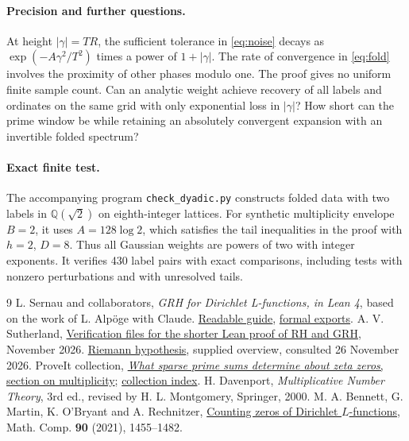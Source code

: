 \documentclass[11pt]{article}
\begin{document}
\paragraph{Precision and further questions.}
At height $|\gamma|=TR$, the sufficient tolerance in \eqref{eq:noise} decays as $\exp(-A\gamma^2/T^2)$ times a power of $1+|\gamma|$. The rate of convergence in \eqref{eq:fold} involves the proximity of other phases modulo one. The proof gives no uniform finite sample count. Can an analytic weight achieve recovery of all labels and ordinates on the same grid with only exponential loss in $|\gamma|$? How short can the prime window be while retaining an absolutely convergent expansion with an invertible folded spectrum?

\paragraph{Exact finite test.} The accompanying program \texttt{check\_dyadic.py} constructs folded data with two labels in $\mathbb Q(\sqrt2)$ on eighth-integer lattices. For synthetic multiplicity envelope $B=2$, it uses $A=128\log2$, which satisfies the tail inequalities in the proof with $h=2$, $D=8$. Thus all Gaussian weights are powers of two with integer exponents. It verifies 430 label pairs with exact comparisons, including tests with nonzero perturbations and with unresolved tails.\par
\begin{thebibliography}{9}\small
{} L. Sernau and collaborators, \emph{GRH for Dirichlet L-functions, in Lean 4}, based on the work of L. Alp\"oge with Claude.
\href{https://github.com/lsernau/grh-lean/blob/72fead102f663d5c7a407964a13dc0cf9d977207/grh/GUIDE.md}{Readable guide},
\href{https://github.com/lsernau/grh-lean/blob/72fead102f663d5c7a407964a13dc0cf9d977207/grh/src/Main.lean}{formal exports}.
 A. V. Sutherland, \href{https://math.mit.edu/~drew/shortgrh/}{Verification files for the shorter Lean proof of RH and GRH}, November 2026.
 \href{https://en.wikipedia.org/wiki/Riemann_hypothesis}{Riemann hypothesis}, supplied overview, consulted 26 November 2026.
 ProveIt collection,
\href{https://github.com/VladimirReshetnikov/ProveIt/blob/2c45d198070f93209d6f0faa2d387ef0a2c4e72c/Analysis/GeneralizedRiemannHypothesis/Research/grh-torsion-and-prime-sampling/sections/simplicity.tex}{\emph{What sparse prime sums determine about zeta zeros}, section on multiplicity};
\href{https://github.com/VladimirReshetnikov/ProveIt/blob/2c45d198070f93209d6f0faa2d387ef0a2c4e72c/Analysis/GeneralizedRiemannHypothesis/README.md}{collection index}.
 H. Davenport, \emph{Multiplicative Number Theory}, 3rd ed., revised by H. L. Montgomery, Springer, 2000.
 M. A. Bennett, G. Martin, K. O'Bryant and A. Rechnitzer, \href{https://doi.org/10.1090/mcom/3599}{Counting zeros of Dirichlet $L$-functions}, Math. Comp. \textbf{90} (2021), 1455--1482.
\end{thebibliography}
\end{document}
